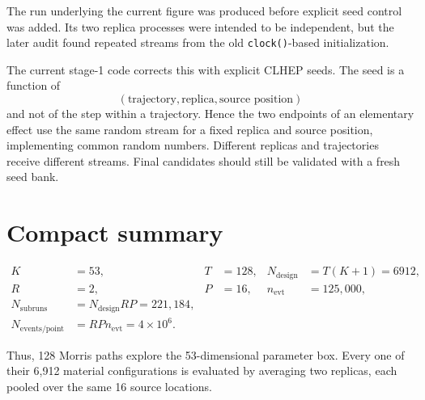 \documentclass[11pt]{article}
\begin{document}
The run underlying the current figure was produced before explicit seed
control was added.  Its two replica processes were intended to be independent,
but the later audit found repeated streams from the old
\texttt{clock()}-based initialization.

The current stage-1 code corrects this with explicit CLHEP seeds.  The seed is
a function of
\[
(\text{trajectory},\text{replica},\text{source position})
\]
and not of the step within a trajectory.  Hence the two endpoints of an
elementary effect use the same random stream for a fixed replica and source
position, implementing common random numbers.  Different replicas and
trajectories receive different streams.  Final candidates should still be
validated with a fresh seed bank.

\section{Compact summary}

\[
\boxed{
\begin{aligned}
K&=53, & T&=128, & N_{\mathrm{design}}&=T(K+1)=6912,\\
R&=2,  & P&=16,  & n_{\mathrm{evt}}&=125{,}000,\\
N_{\mathrm{subruns}}&=N_{\mathrm{design}}RP=221{,}184,\\
N_{\mathrm{events/point}}&=RPn_{\mathrm{evt}}=4\times10^6.
\end{aligned}}
\]

Thus, 128 Morris paths explore the 53-dimensional parameter box.  Every one
of their 6,912 material configurations is evaluated by averaging two
replicas, each pooled over the same 16 source locations.
\end{document}
